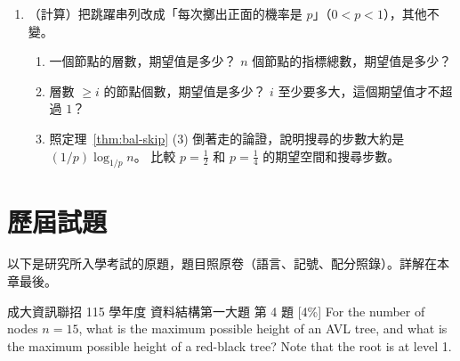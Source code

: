 \begin{enumerate}
\item （計算）把跳躍串列改成「每次擲出正面的機率是 $p$」（$0 < p < 1$），其他不變。
\begin{enumerate}
\item 一個節點的層數，期望值是多少？ $n$ 個節點的指標總數，期望值是多少？
\item 層數 $\ge i$ 的節點個數，期望值是多少？ $i$ 至少要多大，這個期望值才不超過 $1$？
\item 照定理~\ref{thm:bal-skip} (3) 倒著走的論證，說明搜尋的步數大約是
$(1/p)\log_{1/p} n$。 比較 $p = \frac12$ 和 $p = \frac14$ 的期望空間和搜尋步數。
\end{enumerate}

\end{enumerate}

\section{歷屆試題}
\label{sec:bal-pastexam}

以下是研究所入學考試的原題，題目照原卷（語言、記號、配分照錄）。詳解在本章最後。

\begin{pastexam}[label={px:bal-1}]{成大資訊聯招 115 學年度 資料結構第一大題 第 4 題}
[4\%] For the number of nodes $n = 15$, what is the maximum possible height of an AVL
tree, and what is the maximum possible height of a red-black tree? Note that the root is
at level 1.\\
\end{pastexam}

